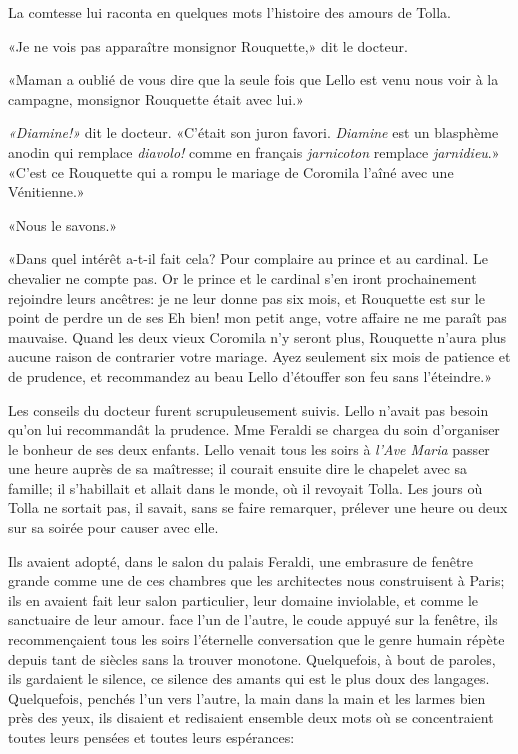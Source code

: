 La comtesse lui raconta en quelques mots l'histoire des amours de Tolla.

«Je ne vois pas apparaître monsignor Rouquette,» dit le docteur.

«Maman a oublié de vous dire que la seule fois que Lello est venu nous
voir à la campagne, monsignor Rouquette était avec lui.»

\emph{«Diamine!»} dit le docteur. «C'était son juron favori.
\emph{Diamine} est un blasphème anodin qui remplace \emph{diavolo!}
comme en français \emph{jarnicoton} remplace \emph{jarnidieu}.» «C'est
ce Rouquette qui a rompu le mariage de Coromila l'aîné avec une
Vénitienne.»

«Nous le savons.»

«Dans quel intérêt a-t-il fait cela? Pour complaire au prince et au
cardinal. Le chevalier ne compte pas. Or le prince et le cardinal s'en
iront prochainement rejoindre leurs ancêtres: je ne leur donne pas six
mois, et Rouquette est sur le point de perdre un de ses Eh bien! mon
petit ange, votre affaire ne me paraît pas mauvaise. Quand les deux
vieux Coromila n'y seront plus, Rouquette n'aura plus aucune raison de
contrarier votre mariage. Ayez seulement six mois de patience et de
prudence, et recommandez au beau Lello d'étouffer son feu sans
l'éteindre.»

Les conseils du docteur furent scrupuleusement suivis. Lello n'avait pas
besoin qu'on lui recommandât la prudence. Mme Feraldi se chargea du soin
d'organiser le bonheur de ses deux enfants. Lello venait tous les soirs
à \emph{l'Ave Maria} passer une heure auprès de sa maîtresse; il courait
ensuite dire le chapelet avec sa famille; il s'habillait et allait dans
le monde, où il revoyait Tolla. Les jours où Tolla ne sortait pas, il
savait, sans se faire remarquer, prélever une heure ou deux sur sa
soirée pour causer avec elle.

Ils avaient adopté, dans le salon du palais Feraldi, une embrasure de
fenêtre grande comme une de ces chambres que les architectes nous
construisent à Paris; ils en avaient fait leur salon particulier, leur
domaine inviolable, et comme le sanctuaire de leur amour. face l'un de
l'autre, le coude appuyé sur la fenêtre, ils recommençaient tous les
soirs l'éternelle conversation que le genre humain répète depuis tant de
siècles sans la trouver monotone. Quelquefois, à bout de paroles, ils
gardaient le silence, ce silence des amants qui est le plus doux des
langages. Quelquefois, penchés l'un vers l'autre, la main dans la main
et les larmes bien près des yeux, ils disaient et redisaient ensemble
deux mots où se concentraient toutes leurs pensées et toutes leurs
espérances:

